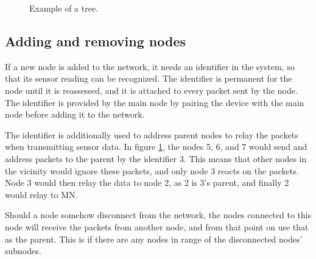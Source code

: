 \begin{figure}[!h]
	\centering
	\caption{Example of a tree.}
	\label{fig:prottree1}
\end{figure}


\subsection*{Adding and removing nodes}
If a new node is added to the network, it needs an identifier in the system, so that its sensor reading can be recognized. The identifier is permanent for the node until it is reassessed, and it is attached to every packet sent by the node.
The identifier is provided by the main node by pairing the device with the main node before adding it to the network. 

The identifier is additionally used to address parent nodes to relay the packets when transmitting sensor data. In figure \ref{fig:prottree1}, the nodes 5, 6, and 7 would send and address packets to the parent by the identifier 3. This means that other nodes in the vicinity would ignore these packets, and only node 3 reacts on the packets. Node 3 would then relay the data to node 2, as 2 is 3's parent, and finally 2 would relay to MN.

Should a node somehow disconnect from the network, the nodes connected to this node will receive the packets from another node, and from that point on use that as the parent. This is  if there are any nodes in range of the disconnected nodes' subnodes. 

